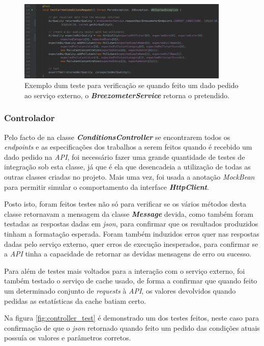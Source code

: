 \begin{figure}[h]
   \centering
   \includegraphics[width=0.90\textwidth]{images/test_service}
   \caption{Exemplo dum teste para verificação se quando feito um dado pedido ao serviço externo, o \textbf{\textit{BreezometerService}} retorna o pretendido.}
   \label{fig:test_service}
\end{figure}


\subsubsection{Controlador}
Pelo facto de na classe \textbf{\textit{ConditionsController}} se encontrarem todos os \textit{endpoints} e as especificações dos trabalhos a serem feitos quando é recebido um dado pedido na \textit{API}, foi necessário fazer uma grande quantidade de testes de integração sob esta classe, já que é ela que desencadeia a utilização de todas as outras classes criadas no projeto. Mais uma vez, foi usada a anotação \textit{MockBean} para permitir simular o comportamento da interface \textbf{\textit{HttpClient}}.

Posto isto, foram feitos testes não só para verificar se os vários métodos desta classe retornavam a mensagem da classe \textbf{\textit{Message}} devida, como também foram testadas as respostas dadas em \textit{json}, para confirmar que os resultados produzidos tinham a formatação esperada. Foram também induzidos erros quer nas respostas dadas pelo serviço externo, quer erros de execução inesperados, para confirmar se a \textit{API} tinha a capacidade de retornar as devidas mensagens de erro ou sucesso.

Para além de testes mais voltados para a interação com o serviço externo, foi também testado o serviço de cache usado, de forma a confirmar que quando feito um determinado conjunto de \textit{requests} à \textit{API}, os valores devolvidos quando pedidas as estatísticas da cache batiam certo.

Na figura \ref{fig:controller_test} é demonstrado um dos testes feitos, neste caso para confirmação de que o \textit{json} retornado quando feito um pedido das condições atuais possuía os valores e parâmetros corretos.

